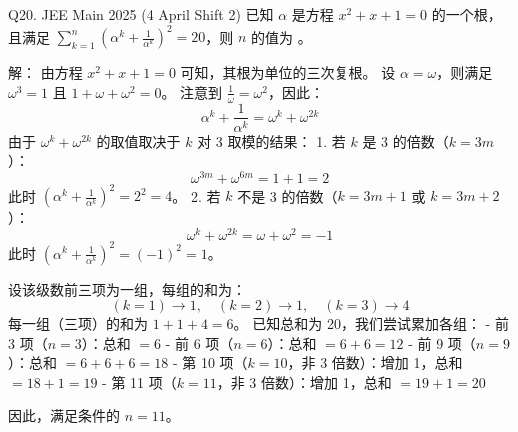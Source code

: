 \begin{questions}

    \question Q20. JEE Main 2025 (4 April Shift 2)
已知 $\alpha$ 是方程 $x^2 + x + 1 = 0$ 的一个根，且满足 $\sum_{k=1}^n \left( \alpha^k + \frac{1}{\alpha^k} \right)^2 = 20$，则 $n$ 的值为 \underline{\hspace{1cm}}。

\begin{solution}
解：
由方程 $x^2 + x + 1 = 0$ 可知，其根为单位的三次复根。
设 $\alpha = \omega$，则满足 $\omega^3 = 1$ 且 $1 + \omega + \omega^2 = 0$。
注意到 $\frac{1}{\omega} = \omega^2$，因此：
\[
\alpha^k + \frac{1}{\alpha^k} = \omega^k + \omega^{2k}
\]
由于 $\omega^k + \omega^{2k}$ 的取值取决于 $k$ 对 3 取模的结果：
1. 若 $k$ 是 3 的倍数（$k=3m$）：
\[
\omega^{3m} + \omega^{6m} = 1 + 1 = 2
\]
此时 $\left( \alpha^k + \frac{1}{\alpha^k} \right)^2 = 2^2 = 4$。
2. 若 $k$ 不是 3 的倍数（$k=3m+1$ 或 $k=3m+2$）：
\[
\omega^k + \omega^{2k} = \omega + \omega^2 = -1
\]
此时 $\left( \alpha^k + \frac{1}{\alpha^k} \right)^2 = (-1)^2 = 1$。

设该级数前三项为一组，每组的和为：
\[
(k=1) \to 1, \quad (k=2) \to 1, \quad (k=3) \to 4
\]
每一组（三项）的和为 $1 + 1 + 4 = 6$。
已知总和为 20，我们尝试累加各组：
- 前 3 项（$n=3$）：总和 $= 6$
- 前 6 项（$n=6$）：总和 $= 6 + 6 = 12$
- 前 9 项（$n=9$）：总和 $= 6 + 6 + 6 = 18$
- 第 10 项（$k=10$，非 3 倍数）：增加 1，总和 $= 18 + 1 = 19$
- 第 11 项（$k=11$，非 3 倍数）：增加 1，总和 $= 19 + 1 = 20$

因此，满足条件的 $n = 11$。
\end{solution}


\end{questions}
